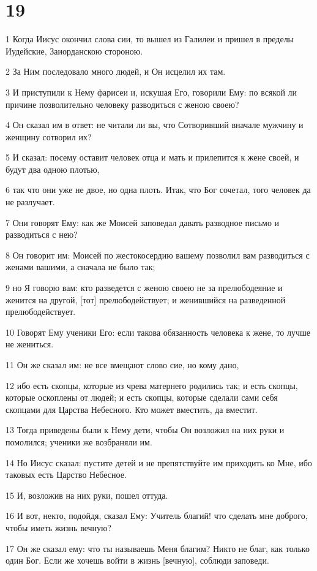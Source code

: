\chapter{19}

\par 1 Когда Иисус окончил слова сии, то вышел из Галилеи и пришел в пределы Иудейские, Заиорданскою стороною.
\par 2 За Ним последовало много людей, и Он исцелил их там.
\par 3 И приступили к Нему фарисеи и, искушая Его, говорили Ему: по всякой ли причине позволительно человеку разводиться с женою своею?
\par 4 Он сказал им в ответ: не читали ли вы, что Сотворивший вначале мужчину и женщину сотворил их?
\par 5 И сказал: посему оставит человек отца и мать и прилепится к жене своей, и будут два одною плотью,
\par 6 так что они уже не двое, но одна плоть. Итак, что Бог сочетал, того человек да не разлучает.
\par 7 Они говорят Ему: как же Моисей заповедал давать разводное письмо и разводиться с нею?
\par 8 Он говорит им: Моисей по жестокосердию вашему позволил вам разводиться с женами вашими, а сначала не было так;
\par 9 но Я говорю вам: кто разведется с женою своею не за прелюбодеяние и женится на другой, [тот] прелюбодействует; и женившийся на разведенной прелюбодействует.
\par 10 Говорят Ему ученики Его: если такова обязанность человека к жене, то лучше не жениться.
\par 11 Он же сказал им: не все вмещают слово сие, но кому дано,
\par 12 ибо есть скопцы, которые из чрева матернего родились так; и есть скопцы, которые оскоплены от людей; и есть скопцы, которые сделали сами себя скопцами для Царства Небесного. Кто может вместить, да вместит.
\par 13 Тогда приведены были к Нему дети, чтобы Он возложил на них руки и помолился; ученики же возбраняли им.
\par 14 Но Иисус сказал: пустите детей и не препятствуйте им приходить ко Мне, ибо таковых есть Царство Небесное.
\par 15 И, возложив на них руки, пошел оттуда.
\par 16 И вот, некто, подойдя, сказал Ему: Учитель благий! что сделать мне доброго, чтобы иметь жизнь вечную?
\par 17 Он же сказал ему: что ты называешь Меня благим? Никто не благ, как только один Бог. Если же хочешь войти в жизнь [вечную], соблюди заповеди.
